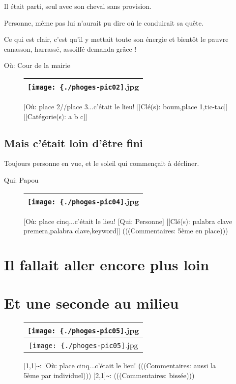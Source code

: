 \documentclass[12pt,twocolumn,french]{article}
\begin{document}
Il était parti, seul avec son cheval sans provision.

Personne, même pas lui n'aurait pu dire où le conduirait sa quête.

Ce qui est clair, c'est qu'il y mettait toute son énergie et bientôt le pauvre canasson, harrassé, assoiffé demanda grâce !


Où: Cour de la mairie

  \begin{figure}[H]
    \label{phoges-pic02.jpg}
    \noindent \centering{}
    \begin{tabular}{|c|}
      \hline
          \texttt{[image: \{./phoges-pic02]}.jpg}
        \tabularnewline \hline
    \end{tabular}
    \vspace{2mm}
    \caption{
       [Où: place 2//place 3...c'était le lieu!
      [[Clé(s): boum,place 1,tic-tac]] 
      [[Catégorie(s): a b c]] 
    }
  \end{figure}
%
\subsection{Mais c'était loin d'être fini}
%

Toujours personne en vue, et le soleil qui commençait à décliner.


Qui: Papou

  \begin{figure}[H]
    \label{phoges-pic04.jpg}
    \noindent \centering{}
    \begin{tabular}{|c|}
      \hline
          \texttt{[image: \{./phoges-pic04]}.jpg}
        \tabularnewline \hline
    \end{tabular}
    \vspace{2mm}
    \caption{
       [Où: place cinq...c'était le lieu!
       [Qui: Personne] 
      [[Clé(s): palabra clave premera,palabra clave,keyword]] 
      (((Commentaires: 5ème en place)))
    }
  \end{figure}
 \onecolumn
\clearpage
%
\section{Il fallait aller encore plus loin}
%
 \section*{Et une seconde au milieu}
  \begin{figure}[H]
    \label{phoges-pic05.jpg}
    \noindent \centering{}
    \begin{tabular}{|c|}
      \hline
          \texttt{[image: \{./phoges-pic05]}.jpg}
        \tabularnewline \hline
          \texttt{[image: \{./phoges-pic05]}.jpg}
        \tabularnewline \hline
    \end{tabular}
    \vspace{2mm}
    \caption{
      [1,1]\texttt{\~{}}: 
       [Où: place cinq...c'était le lieu!
      (((Commentaires: aussi la 5ème par individuel)))
      [2,1]\texttt{\~{}}: 
      (((Commentaires: bissée)))
    }
  \end{figure}
 \twocolumn
\clearpage
%
\end{document}
